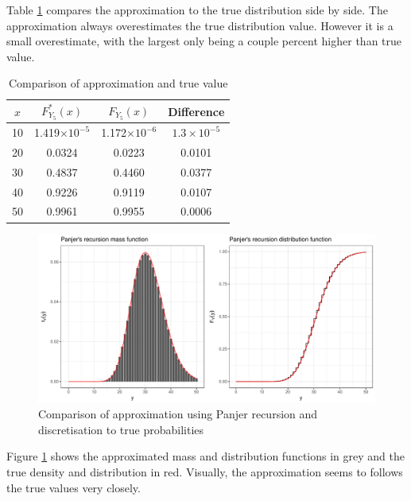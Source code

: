 \documentclass[titlepage]{article}
\begin{document}
	Table \ref{Table:T3 value comparison} compares the approximation to the true distribution side by side. The approximation always overestimates the true distribution value. However it is a small overestimate, with the largest only being a couple percent higher than true value.\\
	\begin{table}[H]
		\begin{center}
			\begin{tabular}{ |c|ccc|} 
				\hline
				$x$ & $F^*_{Y_5}(x) $& $F_{Y_5}(x) $ & Difference \\ 
				\hline
				10 & 1.419$\times 10 ^{-5}$ & 1.172$\times 10 ^{-6}$ & $1.3 \times 10^{-5}$\\ 
				20 & 0.0324 & 0.0223 & 0.0101\\ 
				30 & 0.4837 & 0.4460 & 0.0377\\ 
				40 & 0.9226 & 0.9119 & 0.0107\\ 
				50 & 0.9961 & 0.9955 & 0.0006\\
				\hline
			\end{tabular} \caption{Comparison of approximation and true value} \label{Table:T3 value comparison}
		\end{center}
	\end{table}
	
	\begin{figure}[H]
		\centering
		\includegraphics[scale = 0.6]{panjer_combined.PDF}
		\caption{Comparison of approximation using Panjer recursion and discretisation to true probabilities} \label{fig:T3 combined graph}
	\end{figure} 
	Figure \ref{fig:T3 combined graph} shows the approximated mass and distribution functions in grey and the true density and distribution in red. Visually, the approximation seems to follows the true values very closely.
	
	
	
\end{document}
